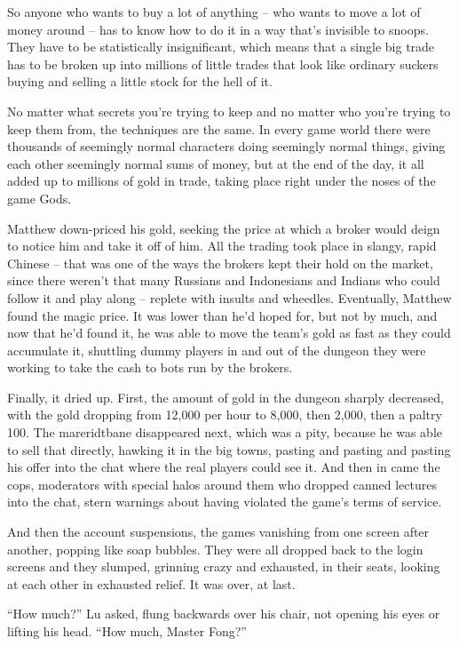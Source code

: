 So anyone who wants to buy a lot of anything -- who wants to move a
lot of money around -- has to know how to do it in a way that's
invisible to snoops. They have to be statistically insignificant,
which means that a single big trade has to be broken up into
millions of little trades that look like ordinary suckers buying
and selling a little stock for the hell of it.

No matter what secrets you're trying to keep and no matter who
you're trying to keep them from, the techniques are the same. In
every game world there were thousands of seemingly normal
characters doing seemingly normal things, giving each other
seemingly normal sums of money, but at the end of the day, it all
added up to millions of gold in trade, taking place right under the
noses of the game Gods.

Matthew down-priced his gold, seeking the price at which a broker
would deign to notice him and take it off of him. All the trading
took place in slangy, rapid Chinese -- that was one of the ways the
brokers kept their hold on the market, since there weren't that
many Russians and Indonesians and Indians who could follow it and
play along -- replete with insults and wheedles. Eventually,
Matthew found the magic price. It was lower than he'd hoped for,
but not by much, and now that he'd found it, he was able to move
the team's gold as fast as they could accumulate it, shuttling
dummy players in and out of the dungeon they were working to take
the cash to bots run by the brokers.

Finally, it dried up. First, the amount of gold in the dungeon
sharply decreased, with the gold dropping from 12,000 per hour to
8,000, then 2,000, then a paltry 100. The mareridtbane disappeared
next, which was a pity, because he was able to sell that directly,
hawking it in the big towns, pasting and pasting and pasting his
offer into the chat where the real players could see it. And then
in came the cops, moderators with special halos around them who
dropped canned lectures into the chat, stern warnings about having
violated the game's terms of service.

And then the account suspensions, the games vanishing from one
screen after another, popping like soap bubbles. They were all
dropped back to the login screens and they slumped, grinning crazy
and exhausted, in their seats, looking at each other in exhausted
relief. It was over, at last.

``How much?'' Lu asked, flung backwards over his chair, not opening
his eyes or lifting his head. ``How much, Master Fong?''

